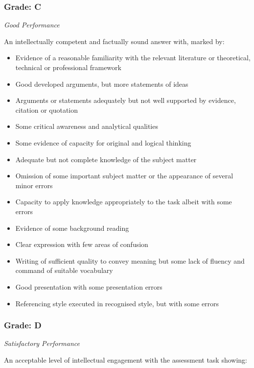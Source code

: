 \subsubsection*{Grade: C}

\textit{Good Performance}

An intellectually competent and factually sound answer with, marked by:

\begin{itemize}
	\item Evidence of a reasonable familiarity with the relevant literature or theoretical, technical or professional framework
	\item Good developed arguments, but more statements of ideas
	\item Arguments or statements adequately but not well supported by evidence, citation or quotation
	\item Some critical awareness and analytical qualities
	\item Some evidence of capacity for original and logical thinking
	\item Adequate but not complete
	knowledge of the subject matter
	\item Omission of some important subject matter or the appearance of several minor errors
	\item Capacity to apply knowledge appropriately to the task albeit with some errors
	\item Evidence of some background reading
	\item Clear expression with few areas of confusion
	\item Writing of sufficient quality to convey meaning but some lack of fluency and command of suitable vocabulary
	\item Good presentation with some presentation errors
	\item Referencing style executed in recognised style, but with some errors
\end{itemize}

\subsubsection*{Grade: D}

\textit{Satisfactory Performance}

An acceptable level of intellectual engagement with the assessment task showing:

